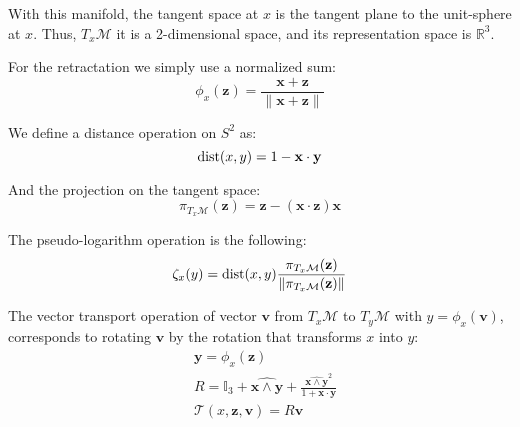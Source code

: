 With this manifold, the tangent space at $x$ is the tangent plane to the unit-sphere at $x$.
Thus, $T_x\mathcal{M}$ it is a 2-dimensional space, and its representation space is $\mathbb{R}^3$.

For the retractation we simply use a normalized sum:
\begin{equation}
  \phi_x(\mathbf{z}) = \frac{\mathbf{x}+\mathbf{z}}{\|\mathbf{x}+\mathbf{z}\|}
\end{equation}

We define a distance operation on $S^2$ as:
\begin{equation}
  \operatorname{dist}(x, y) = 1-\mathbf{x}\cdot \mathbf{y}
\end{equation}

And the projection on the tangent space:
\begin{equation}
  \pi_{T_x\mathcal{M}}(\mathbf{z}) = \mathbf{z} - (\mathbf{x} \cdot \mathbf{z}) \mathbf{x}
\end{equation}

The pseudo-logarithm operation is the following:
\begin{equation}
  \zeta_x(y) = \operatorname{dist}(x,y)\frac{\pi_{T_x\mathcal{M}}(\mathbf{z})}{\|\pi_{T_x\mathcal{M}}(\mathbf{z})\|}
\end{equation}

The vector transport operation of vector $\mathbf{v}$ from $T_x\mathcal{M}$ to $T_y\mathcal{M}$ with $y = \phi_x(\mathbf{v})$, corresponds to rotating $\mathbf{v}$ by the rotation that transforms $x$ into $y$:
\begin{align}
  &\mathbf{y} = \phi_x(\mathbf{z}) \\
  &R = \mathbb{I}_3 + \widehat{\mathbf{x} \wedge \mathbf{y}} + \frac{{\widehat{\mathbf{x} \wedge \mathbf{y} } }^2}{1+\mathbf{x}\cdot\mathbf{y}} \\
  &\mathcal{T}(x,\mathbf{z}, \mathbf{v}) = R\mathbf{v}
\end{align}

